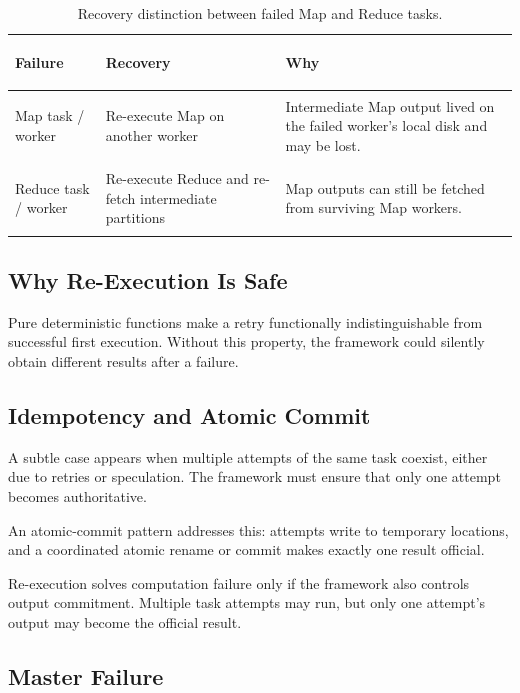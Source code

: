 \documentclass[11pt,a4paper,oneside]{book}
\begin{document}
\begin{table}[htbp]
\centering
\caption{Recovery distinction between failed Map and Reduce tasks.}
\label{tab:map-reduce-failure}
\begin{tabularx}{\textwidth}{>{\bfseries\raggedright\arraybackslash}p{3.0cm} Y Y}
\toprule
{}
Failure & Recovery & Why \\
\midrule
Map task / worker & Re-execute Map on another worker & Intermediate Map output lived on the failed worker's local disk and may be lost. \\
Reduce task / worker & Re-execute Reduce and re-fetch intermediate partitions & Map outputs can still be fetched from surviving Map workers. \\
\bottomrule
\end{tabularx}
\end{table}

\subsection{Why Re-Execution Is Safe}

Pure deterministic functions make a retry functionally indistinguishable from successful first execution. Without this property, the framework could silently obtain different results after a failure.

\subsection{Idempotency and Atomic Commit}

A subtle case appears when multiple attempts of the same task coexist, either due to retries or speculation. The framework must ensure that only one attempt becomes authoritative.

An atomic-commit pattern addresses this: attempts write to temporary locations, and a coordinated atomic rename or commit makes exactly one result official.

\begin{keyconcept}
Re-execution solves computation failure only if the framework also controls output commitment. Multiple task attempts may run, but only one attempt's output may become the official result.
\end{keyconcept}

\subsection{Master Failure}
\end{document}
